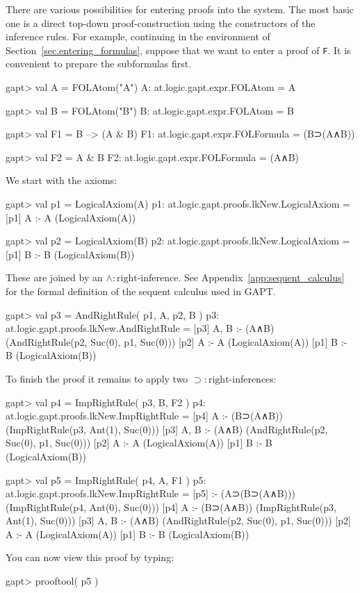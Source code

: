 \documentclass[a4paper,11pt]{article}
\newcommand{\impl}{\supset} %
\renewcommand{\land}{\wedge}
\begin{document}
There are various possibilities for entering proofs into the system. The most
basic one is a direct top-down proof-construction using the constructors
of the inference rules. For example, continuing in the environment of
Section~\ref{sec.entering_formulas}, suppose that we want to enter a
proof of \texttt{F}. It is convenient to prepare the subformulas first.
\begin{clilisting}
gapt> val A = FOLAtom("A")
A: at.logic.gapt.expr.FOLAtom = A

gapt> val B = FOLAtom("B")
B: at.logic.gapt.expr.FOLAtom = B

gapt> val F1 = B --> (A & B)
F1: at.logic.gapt.expr.FOLFormula = (B⊃(A∧B))

gapt> val F2 = A & B
F2: at.logic.gapt.expr.FOLFormula = (A∧B)

\end{clilisting}
%
We start with the axioms:
%
\begin{clilisting}
gapt> val p1 = LogicalAxiom(A)
p1: at.logic.gapt.proofs.lkNew.LogicalAxiom =
[p1] A :- A    (LogicalAxiom(A))

gapt> val p2 = LogicalAxiom(B)
p2: at.logic.gapt.proofs.lkNew.LogicalAxiom =
[p1] B :- B    (LogicalAxiom(B))

\end{clilisting}
%
These are joined by an $\land:\mathrm{right}$-inference. See Appendix~\ref{app:sequent_calculus}
for the formal definition of the sequent calculus used in GAPT.
\begin{clilisting}
gapt> val p3 = AndRightRule( p1, A, p2, B )
p3: at.logic.gapt.proofs.lkNew.AndRightRule =
[p3] A, B :- (A∧B)    (AndRightRule(p2, Suc(0), p1, Suc(0)))
[p2] A :- A    (LogicalAxiom(A))
[p1] B :- B    (LogicalAxiom(B))

\end{clilisting}
%
To finish the proof it remains to apply two $\impl:\mathrm{right}$-inferences:
%
\begin{clilisting}
gapt> val p4 = ImpRightRule( p3, B, F2 )
p4: at.logic.gapt.proofs.lkNew.ImpRightRule =
[p4] A :- (B⊃(A∧B))    (ImpRightRule(p3, Ant(1), Suc(0)))
[p3] A, B :- (A∧B)    (AndRightRule(p2, Suc(0), p1, Suc(0)))
[p2] A :- A    (LogicalAxiom(A))
[p1] B :- B    (LogicalAxiom(B))

gapt> val p5 = ImpRightRule( p4, A, F1 )
p5: at.logic.gapt.proofs.lkNew.ImpRightRule =
[p5]  :- (A⊃(B⊃(A∧B)))    (ImpRightRule(p4, Ant(0), Suc(0)))
[p4] A :- (B⊃(A∧B))    (ImpRightRule(p3, Ant(1), Suc(0)))
[p3] A, B :- (A∧B)    (AndRightRule(p2, Suc(0), p1, Suc(0)))
[p2] A :- A    (LogicalAxiom(A))
[p1] B :- B    (LogicalAxiom(B))

\end{clilisting}
%
You can now view this proof by typing:
\begin{clilisting}
gapt> prooftool( p5 )

\end{clilisting}
\end{document}
